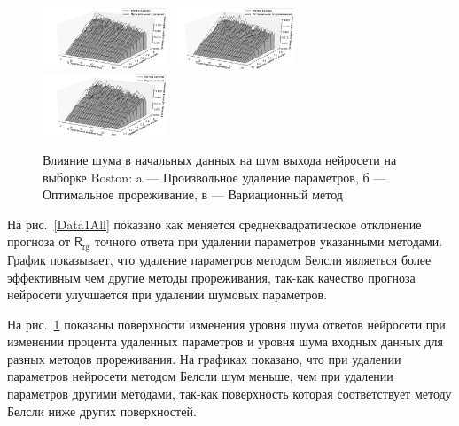 \begin{figure}[ht]\center
\includegraphics[width=0.33\textwidth]{plots/grabovoy/synt_random.pdf}
{\includegraphics[width=0.33\textwidth]{plots/grabovoy/synt_obd.pdf}}
{\includegraphics[width=0.33\textwidth]{plots/grabovoy/synt_var.pdf}}

\caption{Влияние шума в начальных данных на шум выхода нейросети на выборке Boston: a --- Произвольное удаление параметров, б --- Оптимальное прореживание, в --- Вариационный метод}
\label{Data1Noise}
\end{figure}
На рис.~\ref{Data1All} показано как меняется среднеквадратическое отклонение прогноза от $\mathsf{R}_{\text{rg}}$ точного ответа при удалении параметров указанными методами. График показывает, что удаление параметров методом Белсли являеться более эффективным чем другие методы прореживания, так-как качество прогноза нейросети улучшается при удалении шумовых параметров.

На рис.~\ref{Data1Noise} показаны поверхности изменения уровня шума ответов нейросети при изменении процента удаленных параметров и уровня шума входных данных для разных методов прореживания. На графиках показано, что при удалении параметров нейросети методом Белсли шум меньше, чем при удалении параметров другими методами, так-как поверхность которая соответствует методу Белсли ниже других поверхностей.



